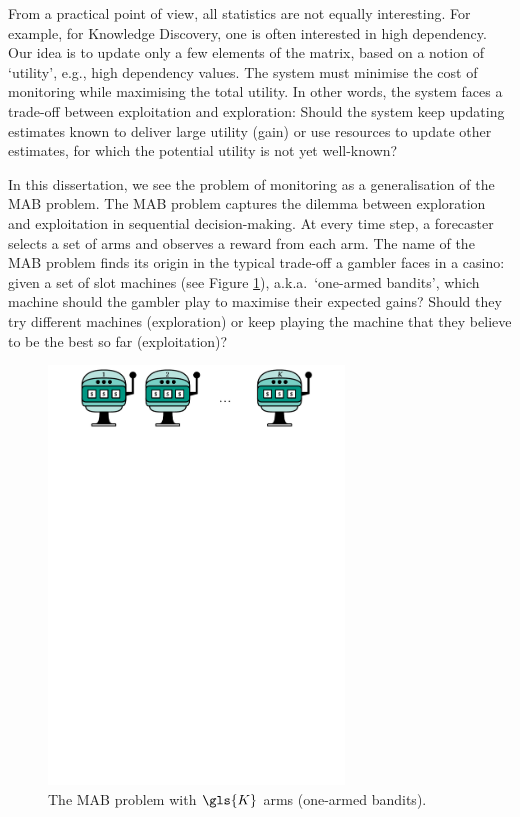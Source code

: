 From a practical point of view, all statistics are not equally interesting. For example, for Knowledge Discovery, one is often interested in high dependency. Our idea is to update only a few elements of the matrix, based on a notion of `utility', e.g., high dependency values. The system must minimise the cost of monitoring while maximising the total utility. %
In other words, the system faces a trade-off between exploitation and exploration: Should the system keep updating estimates known to deliver large utility (gain) or use resources to update other estimates, for which the potential utility is not yet well-known? 


In this dissertation, we see the problem of monitoring as a generalisation of the \gls{MAB} problem. The \gls{MAB} problem captures the dilemma between exploration and exploitation in sequential decision-making. At every time step, a forecaster selects a set of arms and observes a reward from each arm. The name of the \gls{MAB} problem finds its origin in the typical trade-off a gambler faces in a casino: given a set of slot machines (see Figure \ref{fig:MAB}), a.k.a.\ `one-armed bandits', which machine should the gambler play to maximise their expected gains? Should they try different machines (exploration) or keep playing the machine that they believe to be the best so far (exploitation)?   

\begin{figure}
	\centering
	\includegraphics[width=0.70\textwidth]{part1-figures/bandit_1tok-compressed.pdf}
	\caption{The \acrshort{MAB} problem with $\gls{K}$ arms (one-armed bandits).}
	\label{fig:MAB}
\end{figure} 

